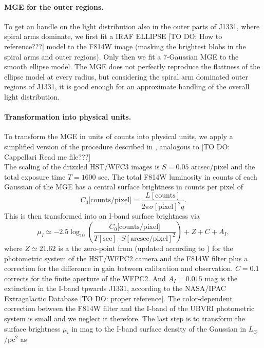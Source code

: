 \paragraph{MGE for the outer regions.} To get an handle on the light distribution also in the outer parts of J1331, where spiral arms dominate, we first fit a IRAF ELLIPSE [TO DO: How to reference???] model to the F814W image (masking the brightest blobs in the spiral arms and outer regions). Only then we fit a 7-Gaussian MGE to the smooth ellipse model. The MGE does not perfectly reproduce the flattness of the ellipse model at every radius, but considering the spiral arm dominated outer regions of J1331, it is good enough for an approximate handling of the overall light distribution.

\paragraph{Transformation into physical units.} To transform the MGE in units of counts into physical units, we apply a simplified version of the procedure described in \citet{Holtzman}, analogous to [TO DO: Cappellari Read me file???]
\\The scaling of the drizzled HST/WFC3 images is  $S = 0.05$ arcsec/pixel and the total exposure time $T = 1600$ sec. The total F814W luminosity in counts of each Gaussian of the MGE has a central surface brightness in counts per pixel of
\begin{equation*}
C_0\text{[counts/pixel]} = \frac{L[\text{counts}]}{2\pi \sigma[\text{pixel}]^2 q}.
\end{equation*}
This is then transformed into an I-band surface brightness via
\begin{equation}
\mu_I \simeq -2.5 \log_{10}\left( \frac{C_0\text{[counts/pixel]}}{T[\text{sec}] \cdot S[\text{arcsec/pixel}]^2}\right) + Z + C + A_I, \label{eq:muI_}
\end{equation}
where $Z\simeq21.62$ is a the zero-point from \citet{Holtzman}  (updated according to \citet{Dolphin,DolphinNew}) for the photometric system of the HST/WFPC2 camera and the F814W filter plus a correction for the difference in gain between calibration and observation. $C= 0.1$ corrects for the finite aperture of the WFPC2. And $A_I =0.015$ mag  is the extinction in the I-band tpwards J1331, according to the NASA/IPAC Extragalactic Database [TO DO: proper reference]. The color-dependent correction between the F814W filter and the I-band of the UBVRI photometric system is  small \citep{Holtzman} and we neglect it therefore. The last step is to transform the surface brightness $\mu_i$ in mag to the I-band surface density of the Gaussian in $L_\odot$/pc$^2$ as
